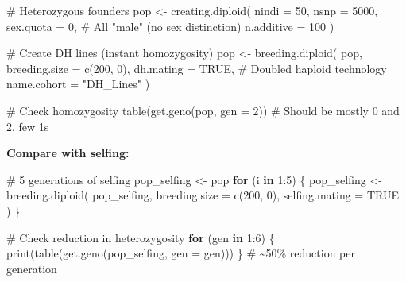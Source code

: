 \documentclass[
  letterpaper,
]{book}
\newenvironment{Shaded}{\begin{snugshade}}{\end{snugshade}}
\newcommand{\AttributeTok}[1]{\textcolor[rgb]{0.40,0.45,0.13}{#1}}
\newcommand{\CommentTok}[1]{\textcolor[rgb]{0.37,0.37,0.37}{#1}}
\newcommand{\ConstantTok}[1]{\textcolor[rgb]{0.56,0.35,0.01}{#1}}
\newcommand{\ControlFlowTok}[1]{\textcolor[rgb]{0.00,0.23,0.31}{\textbf{#1}}}
\newcommand{\DecValTok}[1]{\textcolor[rgb]{0.68,0.00,0.00}{#1}}
\newcommand{\FunctionTok}[1]{\textcolor[rgb]{0.28,0.35,0.67}{#1}}
\newcommand{\NormalTok}[1]{\textcolor[rgb]{0.00,0.23,0.31}{#1}}
\newcommand{\OtherTok}[1]{\textcolor[rgb]{0.00,0.23,0.31}{#1}}
\newcommand{\SpecialCharTok}[1]{\textcolor[rgb]{0.37,0.37,0.37}{#1}}
\newcommand{\StringTok}[1]{\textcolor[rgb]{0.13,0.47,0.30}{#1}}
\begin{document}
\begin{Shaded}
\begin{Highlighting}[]
\CommentTok{\# Heterozygous founders}
\NormalTok{pop }\OtherTok{\textless{}{-}} \FunctionTok{creating.diploid}\NormalTok{(}
  \AttributeTok{nindi =} \DecValTok{50}\NormalTok{,}
  \AttributeTok{nsnp =} \DecValTok{5000}\NormalTok{,}
  \AttributeTok{sex.quota =} \DecValTok{0}\NormalTok{,          }\CommentTok{\# All "male" (no sex distinction)}
  \AttributeTok{n.additive =} \DecValTok{100}
\NormalTok{)}

\CommentTok{\# Create DH lines (instant homozygosity)}
\NormalTok{pop }\OtherTok{\textless{}{-}} \FunctionTok{breeding.diploid}\NormalTok{(}
\NormalTok{  pop,}
  \AttributeTok{breeding.size =} \FunctionTok{c}\NormalTok{(}\DecValTok{200}\NormalTok{, }\DecValTok{0}\NormalTok{),}
  \AttributeTok{dh.mating =} \ConstantTok{TRUE}\NormalTok{,        }\CommentTok{\# Doubled haploid technology}
  \AttributeTok{name.cohort =} \StringTok{"DH\_Lines"}
\NormalTok{)}

\CommentTok{\# Check homozygosity}
\FunctionTok{table}\NormalTok{(}\FunctionTok{get.geno}\NormalTok{(pop, }\AttributeTok{gen =} \DecValTok{2}\NormalTok{))  }\CommentTok{\# Should be mostly 0 and 2, few 1s}
\end{Highlighting}
\end{Shaded}

\textbf{Compare with selfing:}

\begin{Shaded}
\begin{Highlighting}[]
\CommentTok{\# 5 generations of selfing}
\NormalTok{pop\_selfing }\OtherTok{\textless{}{-}}\NormalTok{ pop}
\ControlFlowTok{for}\NormalTok{ (i }\ControlFlowTok{in} \DecValTok{1}\SpecialCharTok{:}\DecValTok{5}\NormalTok{) \{}
\NormalTok{  pop\_selfing }\OtherTok{\textless{}{-}} \FunctionTok{breeding.diploid}\NormalTok{(}
\NormalTok{    pop\_selfing,}
    \AttributeTok{breeding.size =} \FunctionTok{c}\NormalTok{(}\DecValTok{200}\NormalTok{, }\DecValTok{0}\NormalTok{),}
    \AttributeTok{selfing.mating =} \ConstantTok{TRUE}
\NormalTok{  )}
\NormalTok{\}}

\CommentTok{\# Check reduction in heterozygosity}
\ControlFlowTok{for}\NormalTok{ (gen }\ControlFlowTok{in} \DecValTok{1}\SpecialCharTok{:}\DecValTok{6}\NormalTok{) \{}
  \FunctionTok{print}\NormalTok{(}\FunctionTok{table}\NormalTok{(}\FunctionTok{get.geno}\NormalTok{(pop\_selfing, }\AttributeTok{gen =}\NormalTok{ gen)))}
\NormalTok{\}}
\CommentTok{\# \textasciitilde{}50\% reduction per generation}
\end{Highlighting}
\end{Shaded}
\end{document}
